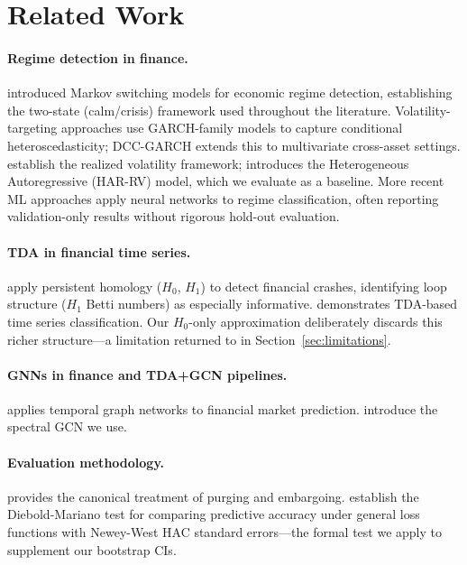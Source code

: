 \documentclass[sigconf]{acmart}
\begin{document}
\section{Related Work}

\paragraph{Regime detection in finance.}
\citet{hamilton1989} introduced Markov switching models for economic regime
detection, establishing the two-state (calm/crisis) framework used throughout
the literature. Volatility-targeting approaches use GARCH-family models
\cite{engle1982,bollerslev1986} to capture conditional heteroscedasticity;
DCC-GARCH \cite{engle2002dcc} extends this to multivariate cross-asset settings.
\citet{andersen2003} establish the realized volatility framework;
\citet{corsi2009} introduces the Heterogeneous Autoregressive (HAR-RV) model,
which we evaluate as a baseline.
More recent ML approaches \cite{guo2022regime,sezer2020financial} apply neural
networks to regime classification, often reporting validation-only results
without rigorous hold-out evaluation.

\paragraph{TDA in financial time series.}
\citet{gidea2018} apply persistent homology ($H_0$, $H_1$) to detect financial
crashes, identifying loop structure ($H_1$ Betti numbers) as especially
informative. \citet{umeda2017} demonstrates TDA-based time series classification.
Our $H_0$-only approximation deliberately discards this richer structure---a
limitation returned to in Section~\ref{sec:limitations}.

\paragraph{GNNs in finance and TDA+GCN pipelines.}
\citet{chen2022temporal} applies temporal graph networks to financial market
prediction. \citet{kipf2017} introduce the spectral GCN we use.

\paragraph{Evaluation methodology.}
\citet{lopezdeprado2018} provides the canonical treatment of purging and
embargoing. \citet{diebold1995} establish the Diebold-Mariano test for
comparing predictive accuracy under general loss functions with Newey-West
HAC standard errors---the formal test we apply to supplement our bootstrap CIs.
\end{document}
